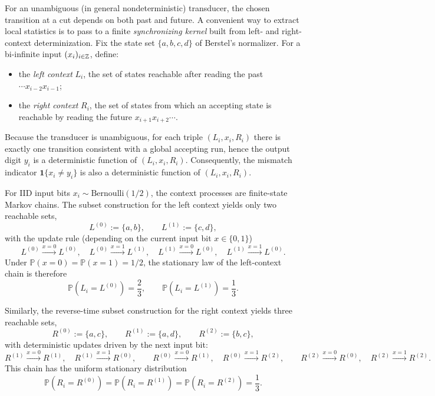 For an unambiguous (in general nondeterministic) transducer, the chosen transition at a cut depends on both past and future.
A convenient way to extract local statistics is to pass to a finite \emph{synchronizing kernel} built from left- and right-context determinization.
Fix the state set $\{a,b,c,d\}$ of Berstel's normalizer.
For a bi-infinite input $(x_i)_{i\in\mathbb{Z}}$, define:
\begin{itemize}
  \item the \emph{left context} $L_i$, the set of states reachable after reading the past $\cdots x_{i-2}x_{i-1}$;
  \item the \emph{right context} $R_i$, the set of states from which an accepting state is reachable by reading the future $x_{i+1}x_{i+2}\cdots$.
\end{itemize}
Because the transducer is unambiguous, for each triple $(L_i,x_i,R_i)$ there is exactly one transition consistent with a global accepting run, hence the output digit $y_i$ is a deterministic function of $(L_i,x_i,R_i)$.
Consequently, the mismatch indicator $\mathbf 1\{x_i\neq y_i\}$ is also a deterministic function of $(L_i,x_i,R_i)$.

For IID input bits $x_i\sim\mathrm{Bernoulli}(1/2)$, the context processes are finite-state Markov chains.
The subset construction for the left context yields only two reachable sets,
\[
L^{(0)}:=\{a,b\},\qquad L^{(1)}:=\{c,d\},
\]
with the update rule (depending on the current input bit $x\in\{0,1\}$)
\begin{equation}\label{eq:left-context-updates}
L^{(0)}\xrightarrow{x=0}L^{(0)},\quad
L^{(0)}\xrightarrow{x=1}L^{(1)},\quad
L^{(1)}\xrightarrow{x=0}L^{(0)},\quad
L^{(1)}\xrightarrow{x=1}L^{(0)}.
\end{equation}
Under $\mathbb P(x=0)=\mathbb P(x=1)=1/2$, the stationary law of the left-context chain is therefore
\begin{equation}\label{eq:left-context-stationary}
\mathbb P(L_i=L^{(0)})=\frac{2}{3},\qquad \mathbb P(L_i=L^{(1)})=\frac{1}{3}.
\end{equation}

Similarly, the reverse-time subset construction for the right context yields three reachable sets,
\[
R^{(0)}:=\{a,c\},\qquad R^{(1)}:=\{a,d\},\qquad R^{(2)}:=\{b,c\},
\]
with deterministic updates driven by the next input bit:
\begin{equation}\label{eq:right-context-updates}
R^{(1)}\xrightarrow{x=0}R^{(1)},\quad R^{(1)}\xrightarrow{x=1}R^{(0)},\qquad
R^{(0)}\xrightarrow{x=0}R^{(1)},\quad R^{(0)}\xrightarrow{x=1}R^{(2)},\qquad
R^{(2)}\xrightarrow{x=0}R^{(0)},\quad R^{(2)}\xrightarrow{x=1}R^{(2)}.
\end{equation}
This chain has the uniform stationary distribution
\begin{equation}\label{eq:right-context-stationary}
\mathbb P(R_i=R^{(0)})=\mathbb P(R_i=R^{(1)})=\mathbb P(R_i=R^{(2)})=\frac{1}{3}.
\end{equation}

